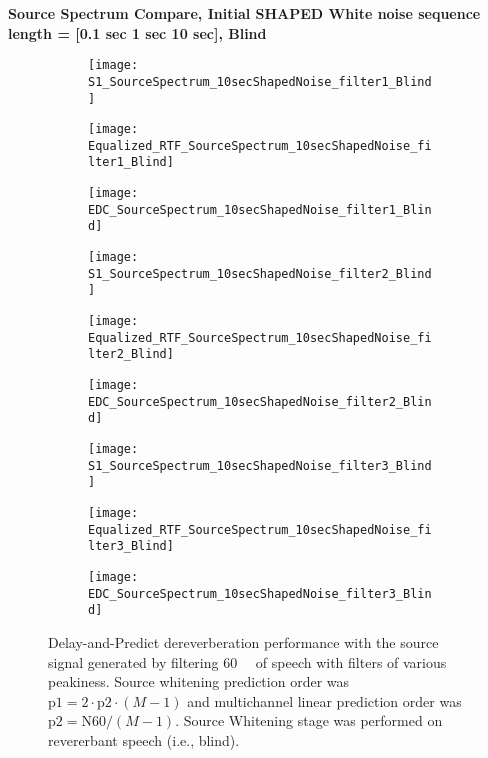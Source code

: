 \textbf{Source Spectrum Compare, Initial SHAPED White noise sequence length = [0.1 sec 1 sec  10 sec], Blind}

\begin{figure}[H]
	\centering
	\begin{subfigure}[b]{0.3\textwidth}
		\centering
		\texttt{[image: S1\_SourceSpectrum\_10secShapedNoise\_filter1\_Blind]}
	\end{subfigure}
	\begin{subfigure}[b]{0.3\textwidth}
		\centering
		\texttt{[image: Equalized\_RTF\_SourceSpectrum\_10secShapedNoise\_filter1\_Blind]}
	\end{subfigure}
	\begin{subfigure}[b]{0.3\textwidth}
		\centering
		\texttt{[image: EDC\_SourceSpectrum\_10secShapedNoise\_filter1\_Blind]}
	\end{subfigure}
	\begin{subfigure}[b]{0.3\textwidth}
		\centering
		\texttt{[image: S1\_SourceSpectrum\_10secShapedNoise\_filter2\_Blind]}
	\end{subfigure}
	\begin{subfigure}[b]{0.3\textwidth}
		\centering
		\texttt{[image: Equalized\_RTF\_SourceSpectrum\_10secShapedNoise\_filter2\_Blind]}
	\end{subfigure}
	\begin{subfigure}[b]{0.3\textwidth}
		\centering
		\texttt{[image: EDC\_SourceSpectrum\_10secShapedNoise\_filter2\_Blind]}
	\end{subfigure}
		\begin{subfigure}[b]{0.3\textwidth}
		\centering
		\texttt{[image: S1\_SourceSpectrum\_10secShapedNoise\_filter3\_Blind]}
	\end{subfigure}
	\begin{subfigure}[b]{0.3\textwidth}
		\centering
		\texttt{[image: Equalized\_RTF\_SourceSpectrum\_10secShapedNoise\_filter3\_Blind]}
	\end{subfigure}
	\begin{subfigure}[b]{0.3\textwidth}
		\centering
		\texttt{[image: EDC\_SourceSpectrum\_10secShapedNoise\_filter3\_Blind]}
	\end{subfigure}
	\caption{Delay-and-Predict dereverberation performance with the source signal generated by filtering \qty{60}{\milli\sec} of speech with filters of various peakiness. Source whitening prediction order was $\mathrm{p1} = 2 \cdot \mathrm{p2} \cdot (M-1)$ and multichannel linear prediction order was $\mathrm{p2} = \mathrm{N60} / (M-1)$. Source Whitening stage was performed on revererbant speech (i.e., blind).}
	\label{fig:params_source_spectrum_shaped_compare}
\end{figure}

